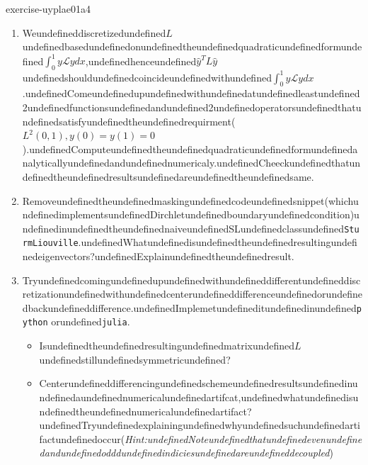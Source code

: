 \begin{mystexercise}{}{exercise-uyplae01a4}\label{exercise-uYPlAE01a4}\label{exercise-uyplae01a4}\begin{enumerate}
\item Weundefineddiscretizedundefined$L$undefinedbasedundefinedonundefinedtheundefinedquadraticundefinedformundefined$\int_0^1 y\mathcal L y dx$,undefinedhenceundefined$\hat y^T L\hat y$undefinedshouldundefinedcoincideundefinedwithundefined$\int_0^1 y\mathcal L y dx$.undefinedComeundefinedupundefinedwithundefinedatundefinedleastundefined2undefinedfunctionsundefinedandundefined2undefinedoperatorsundefinedthatundefinedsatisfyundefinedtheundefinedrequirment($L^2(0,1),y(0)=y(1)=0$).undefinedComputeundefinedtheundefinedquadraticundefinedformundefinedanalyticallyundefinedandundefinednumericaly.undefinedCheeckundefinedthatundefinedtheundefinedresultsundefinedareundefinedtheundefinedsame.
\item Removeundefinedtheundefinedmaskingundefinedcodeundefinedsnippet(whichundefinedimplementsundefinedDirchletundefinedboundaryundefinedcondition)undefinedinundefinedtheundefinednaiveundefinedSLundefinedclassundefined\texttt{SturmLiouville}.undefinedWhatundefinedisundefinedtheundefinedresultingundefinedeigenvectors?undefinedExplainundefinedtheundefinedresult.
\item Tryundefinedcomingundefinedupundefinedwithundefineddifferentundefineddiscretizationundefinedwithundefinedcenterundefineddifferenceundefinedorundefinedbackundefineddifference.undefinedImplemetundefineditundefinedinundefined\texttt{python}
orundefined\texttt{julia}.

\begin{itemize}
\item Isundefinedtheundefinedresultingundefinedmatrixundefined$L$undefinedstillundefinedsymmetricundefined?
\item Centerundefineddifferencingundefinedschemeundefinedresultsundefinedinundefinedaundefinednumericalundefinedartifcat,undefinedwhatundefinedisundefinedtheundefinednumericalundefinedartifact?undefinedTryundefinedexplainingundefinedwhyundefinedsuchundefinedartifactundefinedoccur(\textit{Hint:undefinedNoteundefinedthatundefinedevenundefinedandundefinedodddundefinedindiciesundefinedareundefineddecoupled})
\end{itemize}
\end{enumerate}

\end{mystexercise}
%  
% 
%